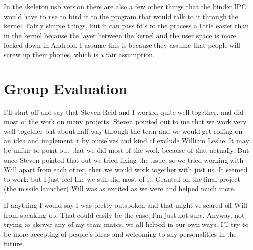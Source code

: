 \documentclass[letterpaper,10pt]{article}
\begin{document}
In the skeleton usb version there are also a few other things that the binder IPC would have to use to bind it to the program that would talk to it through the kernel. Fairly simple things, but it can pass fd's to the process a little easier than in the kernel because the layer between the kernel and the user space is more locked down in Android. I assume this is because they assume that people will screw up their phones, which is a fair assumption.  

\section{Group Evaluation}
I'll start off and say that Steven Reid and I worked quite well together, and did most of the work on many projects. Steven pointed out to me that we work very well together but about half way through the term and we would get rolling on an idea and implement it by ourselves and kind of exclude William Leslie. It may be unfair to point out that we did most of the work because of that actually. But once Steven pointed that out we tried fixing the issue, so we tried working with Will apart from each other, then we would work together with just us. It seemed to work; but I just feel like we still did most of it. Granted on the final project (the missile launcher) Will was as excited as we were and helped much more. 

If anything I would say I was pretty outspoken and that might've scared off Will from speaking up. That could easily be the case; I'm just not sure. Anyway, not trying to skewer any of my team mates, we all helped in our own ways. I'll try to be more accepting of people's ideas and welcoming to shy personalities in the future.  
\end{document}
